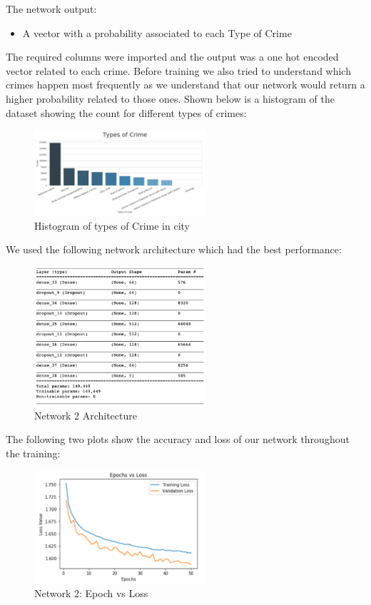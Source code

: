 \documentclass[conference]{IEEEtran}
\begin{document}
The network output:

\begin{itemize}
  \item A vector with a probability associated to each Type of Crime\\
\end{itemize}

The required columns were imported and the output was a one hot encoded vector related to each crime. Before training we also
tried to understand which crimes happen most frequently as we understand that our network would return a higher probability related
to those ones. Shown below is a histogram of the dataset showing the count for different types of crimes:

\begin{figure}[H]
  \centering
  \captionsetup{justification=centering}
  \centering
  \includegraphics[width=2.5in]{10.png}
  \caption{Histogram of types of Crime in city}  
  \label{1}
\end{figure}

We used the following network architecture which had the best performance:

\begin{figure}[H]
  \centering
  \captionsetup{justification=centering}
  \centering
  \includegraphics[width=2.5in]{11.png}
  \caption{Network 2 Architecture}  
  \label{1}
\end{figure}

The following two plots show the accuracy and loss of our network throughout the training:

\begin{figure}[H]
  \centering
  \captionsetup{justification=centering}
  \centering
  \includegraphics[width=2.5in]{12.png}
  \caption{Network 2: Epoch vs Loss}  
  \label{1}
\end{figure}
\end{document}
